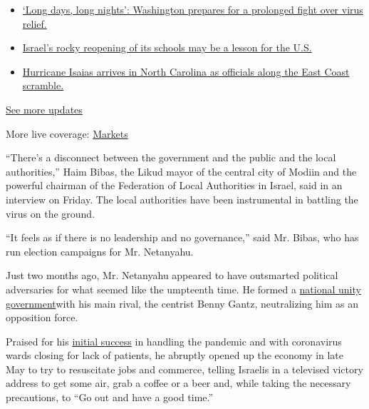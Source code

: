 \begin{itemize}
\tightlist
\item
  \href{https://www.nytimes.com/2020/08/04/world/coronavirus-covid-19.html?action=click\&pgtype=Article\&state=default\&region=MAIN_CONTENT_1\&context=storylines_live_updates\#link-6b644638}{`Long
  days, long nights': Washington prepares for a prolonged fight over
  virus relief.}
\item
  \href{https://www.nytimes.com/2020/08/04/world/coronavirus-covid-19.html?action=click\&pgtype=Article\&state=default\&region=MAIN_CONTENT_1\&context=storylines_live_updates\#link-7af9fca0}{Israel's
  rocky reopening of its schools may be a lesson for the U.S.}
\item
  \href{https://www.nytimes.com/2020/08/04/world/coronavirus-covid-19.html?action=click\&pgtype=Article\&state=default\&region=MAIN_CONTENT_1\&context=storylines_live_updates\#link-33bf9168}{Hurricane
  Isaias arrives in North Carolina as officials along the East Coast
  scramble.}
\end{itemize}

\href{https://www.nytimes.com/2020/08/04/world/coronavirus-covid-19.html?action=click\&pgtype=Article\&state=default\&region=MAIN_CONTENT_1\&context=storylines_live_updates}{See
more updates}

More live coverage:
\href{https://www.nytimes.com/live/2020/08/03/business/stock-market-today-coronavirus?action=click\&pgtype=Article\&state=default\&region=MAIN_CONTENT_1\&context=storylines_live_updates}{Markets}

``There's a disconnect between the government and the public and the
local authorities,'' Haim Bibas, the Likud mayor of the central city of
Modiin and the powerful chairman of the Federation of Local Authorities
in Israel, said in an interview on Friday. The local authorities have
been instrumental in battling the virus on the ground.

``It feels as if there is no leadership and no governance,'' said Mr.
Bibas, who has run election campaigns for Mr. Netanyahu.

Just two months ago, Mr. Netanyahu appeared to have outsmarted political
adversaries for what seemed like the umpteenth time. He formed a
\href{https://www.nytimes.com/2020/05/17/world/middleeast/israel-netanyahu-gantz-government.html?searchResultPosition=16}{national
unity government}with his main rival, the centrist Benny Gantz,
neutralizing him as an opposition force.

Praised for his
\href{https://www.nytimes.com/2020/03/13/world/middleeast/israel-coronavirus-netanyahu.html?searchResultPosition=1}{initial
success} in handling the pandemic and with coronavirus wards closing for
lack of patients, he abruptly opened up the economy in late May to try
to resuscitate jobs and commerce, telling Israelis in a televised
victory address to get some air, grab a coffee or a beer and, while
taking the necessary precautions, to ``Go out and have a good time.''

